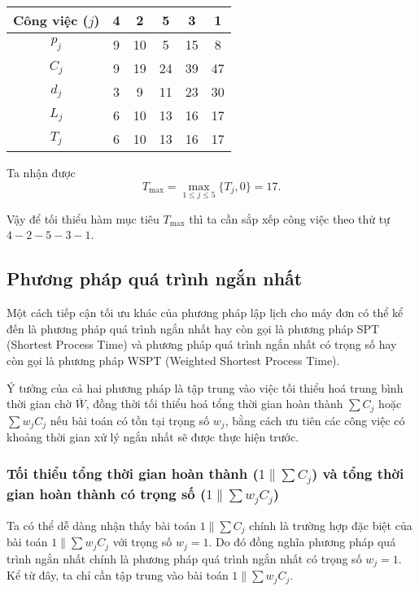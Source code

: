 \documentclass[12pt,a4paper]{report}
\begin{document}
\begin{table}[h!]
	\centering
	\begin{tabular}{|c | c c c c c |} 
	\hline
	Công việc ($j$) & 4 & 2 & 5 & 3 & 1 \\
	\hline\hline
	$p_j$ & 9 & 10 & 5 & 15 & 8 \\
	$C_j$ & 9 & 19 & 24 & 39 & 47 \\
	$d_j$ & 3 & 9 & 11 & 23 & 30 \\
	$L_j$ & 6 & 10 & 13 & 16 & 17 \\
	$T_j$ & 6 & 10 & 13 & 16 & 17 \\
	\hline
	\end{tabular}
\end{table}

Ta nhận được
\begin{equation*}
	T_{\max} = \max _{1 \leq j \leq 5} \{T_j, 0\} = 17.
\end{equation*}

Vậy để tối thiểu hàm mục tiêu $T_{\max}$ thì ta cần sắp xếp công việc theo thứ tự $4-2-5-3-1$.
\subsection{Phương pháp quá trình ngắn nhất}
Một cách tiếp cận tối ưu khác của phương pháp lập lịch cho máy đơn có thể kể đến là phương pháp quá trình ngắn nhất hay còn gọi là phương pháp SPT (Shortest Process Time) và phương pháp quá trình ngắn nhất có trọng số hay còn gọi là phương pháp WSPT (Weighted Shortest Process Time).

Ý tưởng của cả hai phương pháp là tập trung vào việc tối thiểu hoá trung bình thời gian chờ $\overline{W}$, đồng thời tối thiểu hoá tổng thời gian hoàn thành $\sum C_j$ hoặc $\sum w_j C_j$ nếu bài toán có tồn tại trọng số $w_j$, bằng cách ưu tiên các công việc có khoảng thời gian xử lý ngắn nhất sẽ được thực hiện trước. 

\subsubsection*{Tối thiểu tổng thời gian hoàn thành ($1 \| \sum C_j$) và tổng thời gian hoàn thành có trọng số ($1 \| \sum w_j C_j$)}
Ta có thể dễ dàng nhận thấy bài toán $1 \| \sum C_j$ chính là trường hợp đặc biệt của bài toán $1 \| \sum w_j C_j$ với trọng số $w_j=1$. Do đó đồng nghĩa phương pháp quá trình ngắn nhất chính là phương pháp quá trình ngắn nhất có trọng số $w_j=1$. Kể từ đây, ta chỉ cần tập trung vào bài toán $1\| \sum w_j C_j$.
\end{document}
